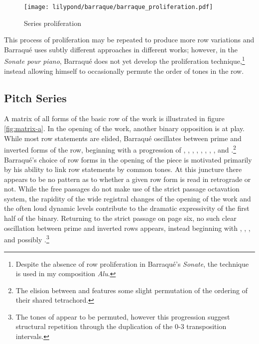 \begin{figure}[H]
    \texttt{[image: lilypond/barraque/barraque\_proliferation.pdf]}
    \caption{Series proliferation}
    \label{fig:proliferation-1}
\end{figure}

This process of proliferation may be repeated to produce more row variations and Barraqué uses subtly different approaches in different works; however, in the \textit{Sonate pour piano}, Barraqué does not yet develop the proliferation technique,\footnote{Despite the absence of row proliferation in Barraqué's \textit{Sonate}, the technique is used in my composition \textit{Alu}.} instead allowing himself to occasionally permute the order of tones in the row.

\subsection{Pitch Series}

A matrix of all forms of the basic row of the work is illustrated in figure \ref{fig:matrix-a}. In the opening of the work, another binary opposition is at play. While most row statements are elided, Barraqué oscillates between prime and inverted forms of the row, beginning with a progression of , , , , , , , , and .\footnote{The elision between  and  features some slight permutation of the ordering of their shared tetrachord.} Barraqué's choice of row forms in the opening of the piece is motivated primarily by his ability to link row statements by common tones. At this juncture there appears to be no pattern as to whether a given row form is read in retrograde or not. While the free passages do not make use of the strict passage octavation system, the rapidity of the wide registral changes of the opening of the work and the often loud dynamic levels contribute to the dramatic expressivity of the first half of the binary. Returning to the strict passage on page six, no such clear oscillation between prime and inverted rows appears, instead beginning with , , , and possibly .\footnote{The tones of  appear to be permuted, however this progression suggest structural repetition through the duplication of the 0-3 transposition intervals.}

